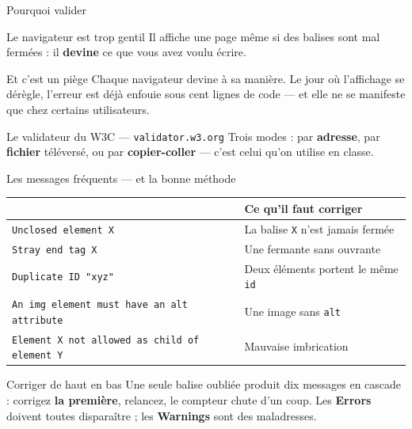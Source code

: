 \documentclass[aspectratio=169,11pt]{beamer}
\newcommand{\hdr}[1]{\multicolumn{1}{l}{\color{white}\bfseries #1}}
\begin{document}
\begin{frame}{Pourquoi valider}
  \begin{block}{Le navigateur est trop gentil}
    Il affiche une page même si des balises sont mal fermées : il \textbf{devine} ce que vous avez voulu écrire.
  \end{block}
  \vspace{0.3cm}
  \begin{alertblock}{Et c'est un piège}
    Chaque navigateur devine à sa manière. Le jour où l'affichage se dérègle, l'erreur est déjà enfouie sous cent lignes de code --- et elle ne se manifeste que chez certains utilisateurs.
  \end{alertblock}
  \vspace{0.3cm}
  \begin{exampleblock}{Le validateur du W3C --- \texttt{validator.w3.org}}
    Trois modes : par \textbf{adresse}, par \textbf{fichier} téléversé, ou par \textbf{copier-coller} --- c'est celui qu'on utilise en classe.
  \end{exampleblock}
\end{frame}

\begin{frame}{Les messages fréquents --- et la bonne méthode}
  \begin{center}
  \small
  \begin{tabularx}{0.97\textwidth}{p{5.4cm}X}
    \toprule
    \rowcolor{accentBlue}
    \hdr{Message} & \hdr{Ce qu'il faut corriger} \\
    \midrule
    \rowcolor{cfptGrey}
    \texttt{Unclosed element X} & La balise \texttt{X} n'est jamais fermée \\
    \texttt{Stray end tag X} & Une fermante sans ouvrante \\
    \rowcolor{cfptGrey}
    \texttt{Duplicate ID "xyz"} & Deux éléments portent le même \texttt{id} \\
    \texttt{An img element must have an alt attribute} & Une image sans \texttt{alt} \\
    \rowcolor{cfptGrey}
    \texttt{Element X not allowed as child of element Y} & Mauvaise imbrication \\
    \bottomrule
  \end{tabularx}
  \end{center}
  \vspace{0.2cm}
  \begin{alertblock}{Corriger de haut en bas}
    Une seule balise oubliée produit dix messages en cascade : corrigez \textbf{la première}, relancez, le compteur chute d'un coup. Les \textbf{Errors} doivent toutes disparaître ; les \textbf{Warnings} sont des maladresses.
  \end{alertblock}
\end{frame}
\end{document}
